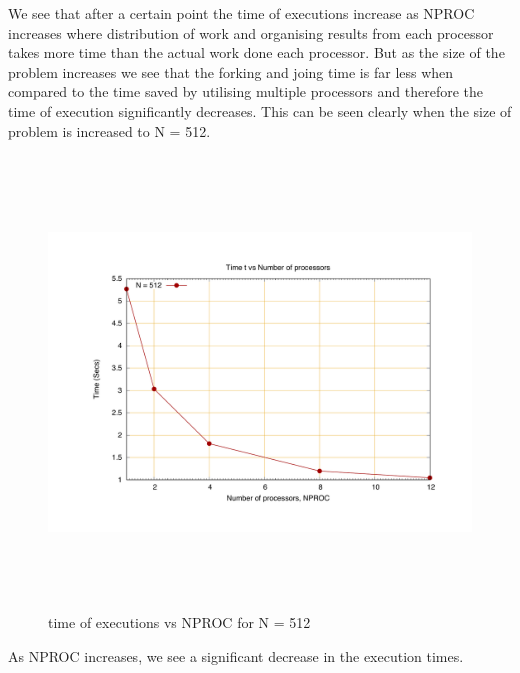 \documentclass[fleqn,letterpaper,12pt]{report}
\begin{document}
We see that after a certain point the time of executions increase as NPROC increases where distribution of work and organising results from each processor takes more time than the actual work done each processor. But as the size of the problem increases we see that the forking and joing time is far less when compared to the time saved by utilising multiple processors and therefore the time of execution significantly decreases. This can be seen clearly when the size of problem is increased to N = 512.

\begin{figure}[!h]
	\centering
	\includegraphics[height=120mm,width=160mm]{512.pdf}
	\caption{time of executions vs NPROC for N = 512\label{overflow}}
\end{figure}
As NPROC increases, we see a significant decrease in the execution times.
\end{document}

